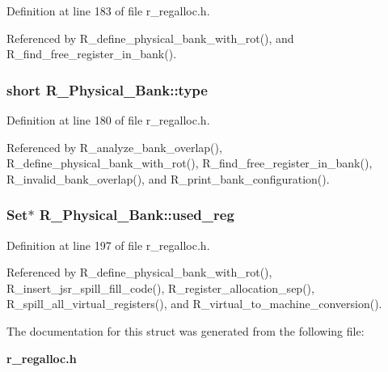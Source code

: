 Definition at line 183 of file r\_\-regalloc.h.

Referenced by R\_\-define\_\-physical\_\-bank\_\-with\_\-rot(), and R\_\-find\_\-free\_\-register\_\-in\_\-bank().
\subsubsection{\setlength{\rightskip}{0pt plus 5cm}short \bf{R\_\-Physical\_\-Bank::type}}\label{structR__Physical__Bank_21bd06d14fd4c812d6819318d382d3da}




Definition at line 180 of file r\_\-regalloc.h.

Referenced by R\_\-analyze\_\-bank\_\-overlap(), R\_\-define\_\-physical\_\-bank\_\-with\_\-rot(), R\_\-find\_\-free\_\-register\_\-in\_\-bank(), R\_\-invalid\_\-bank\_\-overlap(), and R\_\-print\_\-bank\_\-configuration().
\subsubsection{\setlength{\rightskip}{0pt plus 5cm}\bf{Set}$\ast$ \bf{R\_\-Physical\_\-Bank::used\_\-reg}}\label{structR__Physical__Bank_f4b1e21e6915f8a38dd862f368d1b5ab}




Definition at line 197 of file r\_\-regalloc.h.

Referenced by R\_\-define\_\-physical\_\-bank\_\-with\_\-rot(), R\_\-insert\_\-jsr\_\-spill\_\-fill\_\-code(), R\_\-register\_\-allocation\_\-sep(), R\_\-spill\_\-all\_\-virtual\_\-registers(), and R\_\-virtual\_\-to\_\-machine\_\-conversion().

The documentation for this struct was generated from the following file:\begin{CompactItemize}
\item 
\bf{r\_\-regalloc.h}\end{CompactItemize}
